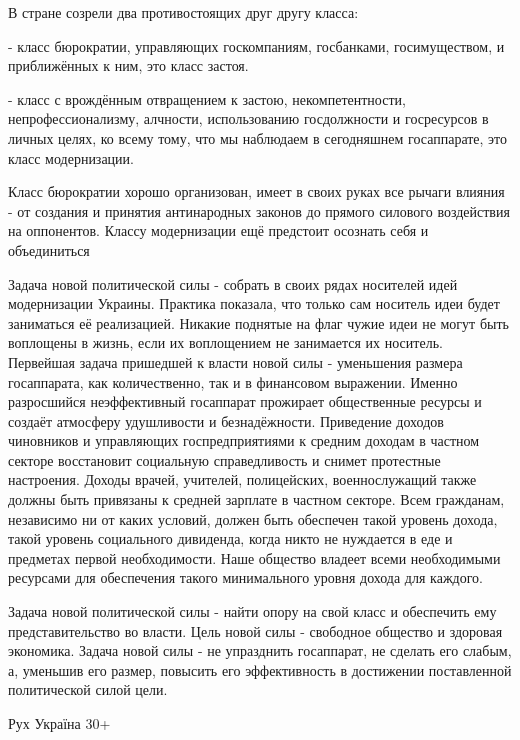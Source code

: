 В стране созрели два противостоящих друг другу класса:

- класс бюрократии, управляющих госкомпаниям, госбанками, госимуществом, и
приближённых к ним, это класс застоя.

- класс с врождённым отвращением к застою, некомпетентности,
непрофессионализму, алчности, использованию госдолжности и госресурсов в личных
целях, ко всему тому, что мы наблюдаем в сегодняшнем госаппарате, это класс
модернизации.

Класс бюрократии хорошо организован, имеет в своих руках все рычаги влияния -
от создания и принятия антинародных законов до прямого силового воздействия на
оппонентов. Классу модернизации ещё предстоит осознать себя и объединиться

Задача новой политической силы - собрать в своих рядах носителей идей
модернизации Украины. Практика показала, что только сам носитель идеи будет
заниматься её реализацией. Никакие поднятые на флаг чужие идеи не могут быть
воплощены в жизнь, если их воплощением не занимается их носитель. Первейшая
задача пришедшей к власти новой силы - уменьшения размера госаппарата, как
количественно, так и в финансовом выражении. Именно разросшийся неэффективный
госаппарат прожирает общественные ресурсы и создаёт атмосферу удушливости и
безнадёжности. Приведение доходов чиновников и управляющих госпредприятиями к
средним доходам в частном секторе восстановит социальную справедливость и
снимет протестные настроения. Доходы врачей, учителей, полицейских,
военнослужащий также должны быть привязаны к средней зарплате в частном
секторе. Всем гражданам, независимо ни от каких условий, должен быть обеспечен
такой уровень дохода, такой уровень социального дивиденда, когда никто не
нуждается в еде и предметах первой необходимости. Наше общество владеет всеми
необходимыми ресурсами для обеспечения такого минимального уровня дохода для
каждого.

Задача новой политической силы - найти опору на свой класс и обеспечить ему
представительство во власти. Цель новой силы - свободное общество и здоровая
экономика. Задача новой силы - не упразднить госаппарат, не сделать его слабым,
а, уменьшив его размер, повысить его эффективность в достижении поставленной
политической силой цели.

Рух Україна 30+

